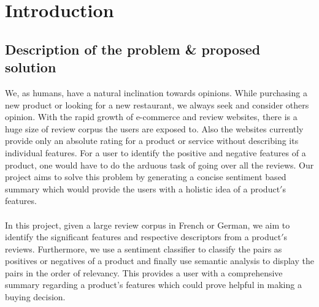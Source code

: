 \documentclass[conference]{IEEEtran}
\begin{document}
%
\IEEEpeerreviewmaketitle

\section{\textbf{Introduction}}
\subsection{\textbf{Description of the problem \& proposed solution}}
\indent We, as humans, have a natural inclination towards opinions. While purchasing a new product or looking for a new restaurant, we always seek and consider others opinion. With the rapid growth of e-commerce and review websites, there is a huge size of review corpus the users are exposed to. Also the websites currently provide only an absolute rating for a product or service without describing its individual features. For a user to identify the positive and negative features of a product, one would have to do the arduous task of going over all the reviews. Our project aims to solve this problem by generating a concise sentiment based summary which would provide the users with a holistic idea of a product$'$s features.\\\\
\indent In this project, given a large review corpus in French or German, we aim to identify the significant features and respective descriptors from a product$'$s reviews. Furthermore, we use a sentiment classifier to classify the pairs as positives or negatives of a product and finally use semantic analysis to display the pairs in the order of relevancy. This provides a user with a comprehensive summary regarding a product$’$s features which could prove helpful in making a buying decision.
\end{document}
